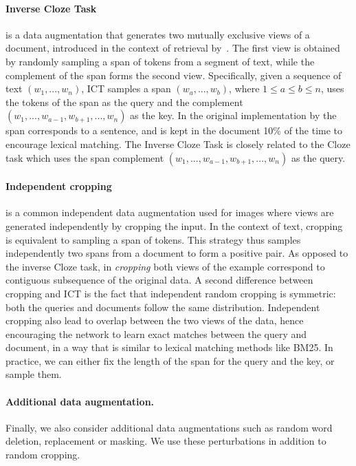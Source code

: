 \documentclass[10pt]{article} %
\begin{document}
\paragraph{Inverse Cloze Task} is a data augmentation that generates two mutually exclusive views of a document, introduced in the context of retrieval by~\citet{lee2019latent}.
The first view is obtained by randomly sampling a span of tokens from a segment of text, while the complement of the span forms the second view.
Specifically, given a sequence of text $(w_1, ..., w_n)$, ICT samples a span $(w_a, ..., w_b)$, where $1 \leq a \leq b \leq n$, uses the tokens of the span as the query and the complement $(w_1, ..., w_{a-1}, w_{b+1}, ..., w_n)$ as the key.
In the original implementation by \citet{lee2019latent} the span corresponds to a sentence, and is kept in the document 10\% of the time to encourage lexical matching.
The Inverse Cloze Task is closely related to the Cloze task which uses the span complement $(w_1, ..., w_{a-1}, w_{b+1}, ..., w_n)$ as the query.

\paragraph{Independent cropping} is a common independent data augmentation used for images where views are generated independently by cropping the input.
In the context of text, cropping is equivalent to sampling a span of tokens.
This strategy thus samples independently two spans from a document to form a positive pair.
As opposed to the inverse Cloze task, in \emph{cropping} both views of the example correspond to contiguous subsequence of the original data.
A second difference between cropping and ICT is the fact that independent random cropping is symmetric: both the queries and documents follow the same distribution.
Independent cropping also lead to overlap between the two views of the data, hence encouraging the network to learn exact matches between the query and document,
in a way that is similar to lexical matching methods like BM25.
In practice, we can either fix the length of the span for the query and the key, or sample them.

\paragraph{Additional data augmentation.}
Finally, we also consider additional data augmentations such as random word deletion, replacement or masking.
We use these perturbations in addition to random cropping.
\end{document}
